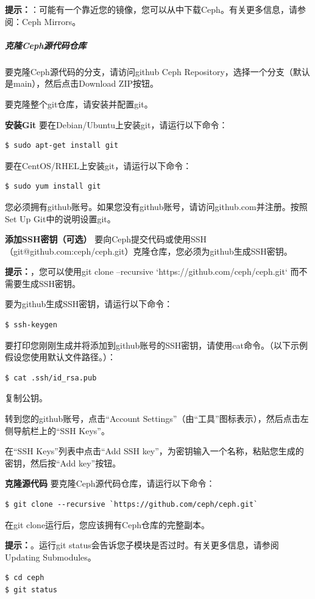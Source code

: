 \documentclass[12pt,UTF8]{ctexbook}
\begin{document}
\textbf{提示：}：可能有一个靠近您的镜像，您可以从中下载Ceph。有关更多信息，请参阅：Ceph Mirrors。

\subparagraph{克隆Ceph源代码仓库}
要克隆Ceph源代码的分支，请访问github Ceph Repository，选择一个分支（默认是main），然后点击Download ZIP按钮。

要克隆整个git仓库，请安装并配置git。

\textbf{安装Git}
要在Debian/Ubuntu上安装git，请运行以下命令：
\begin{verbatim}
$ sudo apt-get install git
\end{verbatim}

要在CentOS/RHEL上安装git，请运行以下命令：
\begin{verbatim}
$ sudo yum install git
\end{verbatim}

您必须拥有github账号。如果您没有github账号，请访问github.com并注册。按照Set Up Git中的说明设置git。

\textbf{添加SSH密钥（可选）}
要向Ceph提交代码或使用SSH（git@github.com:ceph/ceph.git）克隆仓库，您必须为github生成SSH密钥。

\textbf{提示：}，您可以使用git clone --recursive `https://github.com/ceph/ceph.git` 而不需要生成SSH密钥。

要为github生成SSH密钥，请运行以下命令：
\begin{verbatim}
$ ssh-keygen
\end{verbatim}

要打印您刚刚生成并将添加到github账号的SSH密钥，请使用cat命令。（以下示例假设您使用默认文件路径。）：
\begin{verbatim}
$ cat .ssh/id_rsa.pub
\end{verbatim}

复制公钥。

转到您的github账号，点击“Account Settings”（由“工具”图标表示），然后点击左侧导航栏上的“SSH Keys”。

在“SSH Keys”列表中点击“Add SSH key”，为密钥输入一个名称，粘贴您生成的密钥，然后按“Add key”按钮。

\textbf{克隆源代码}
要克隆Ceph源代码仓库，请运行以下命令：
\begin{verbatim}
$ git clone --recursive `https://github.com/ceph/ceph.git`
\end{verbatim}

在git clone运行后，您应该拥有Ceph仓库的完整副本。

\textbf{提示：}。运行git status会告诉您子模块是否过时。有关更多信息，请参阅Updating Submodules。
\begin{verbatim}
$ cd ceph
$ git status
\end{verbatim}
\end{document}
